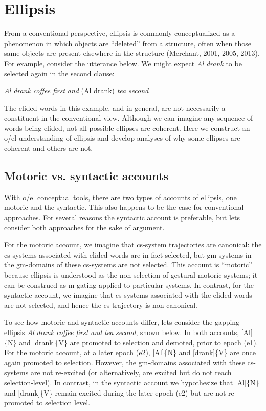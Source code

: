 \section{Ellipsis}

From a conventional perspective, ellipsis is commonly conceptualized as a phenomenon in which objects are “deleted” from a structure, often when those same objects are present elsewhere in the structure (Merchant, 2001, 2005, 2013). For example, consider the utterance below. We might expect \textit{Al} \textit{drank} to be selected again in the second clause:

    \textit{Al} \textit{drank} \textit{coffee} \textit{first} \textit{and} (Al drank) \textit{tea} \textit{second}

  The elided words in this example, and in general, are not necessarily a constituent in the conventional view. Although we can imagine any sequence of words being elided, not all possible ellipses are coherent. Here we construct an o/el understanding of ellipsis and develop analyses of why some ellipses are coherent and others are not.

\subsection{Motoric vs. syntactic accounts}

With o/el conceptual tools, there are two types of accounts of ellipsis, one motoric and the syntactic. This also happens to be the case for conventional approaches. For several reasons the syntactic account is preferable, but lets consider both approaches for the sake of argument. 

  For the motoric account, we imagine that cs-system trajectories are canonical: the cs-systems associated with elided words are in fact selected, but gm-systems in the gm-domains of these cs-systems are not selected. This account is “motoric” because ellipsis is understood as the non-selection of gestural-motoric systems; it can be construed as m-gating applied to particular systems. In contrast, for the syntactic account, we imagine that cs-systems associated with the elided words are not selected, and hence the cs-trajectory is non-canonical.

  To see how motoric and syntactic accounts differ, lets consider the gapping ellipsis \textit{Al} \textit{drank} \textit{coffee} \textit{first} \textit{and} \textit{tea} \textit{second}, shown below. In both accounts, [Al]\{N\} and [drank]\{V\} are promoted to selection and demoted, prior to epoch (e1). For the motoric account, at a later epoch (e2), [Al]\{N\} and [drank]\{V\} are once again promoted to selection. However, the gm-domains associated with these cs-systems are not re-excited (or alternatively, are excited but do not reach selection-level). In contrast, in the syntactic account we hypothesize that [Al]\{N\} and [drank]\{V\} remain excited during the later epoch (e2) but are not re-promoted to selection level. 

